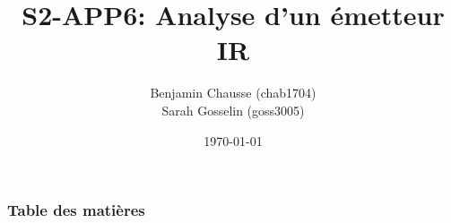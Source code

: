 \documentclass[10pt]{beamer}
\title[S1-APP6: Analyse d'Émetteur IR]{S2-APP6: Analyse d'un émetteur IR}
\author[Benjamin Chausse \& Sarah Gosselin]{
  Benjamin Chausse (chab1704)\\
  Sarah Gosselin (goss3005)
}
\institute[UDS]{Université de Sherbrooke}
\date{\today}
\begin{document}
\maketitle

\begin{frame}
	\frametitle{Table des matières}
	\tableofcontents
\end{frame}




\end{document}
